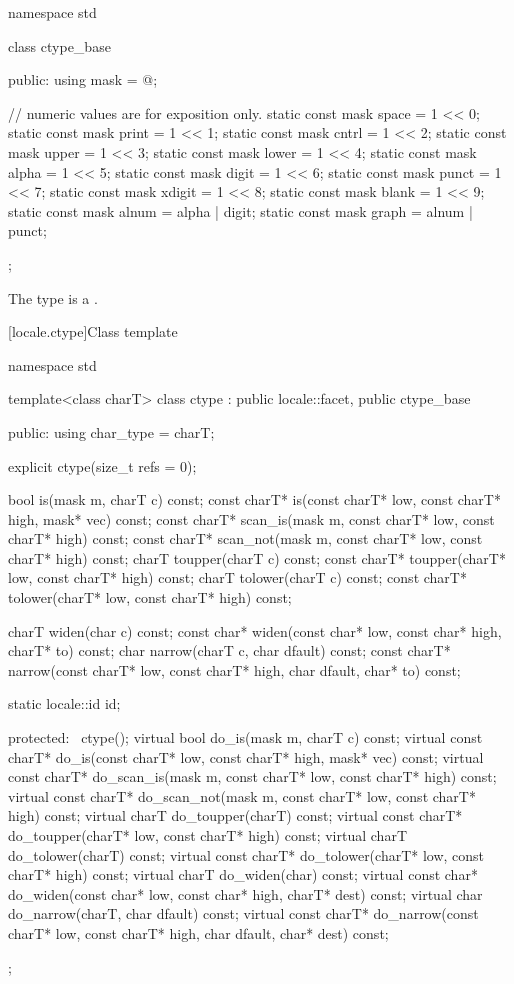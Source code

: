 %
\begin{codeblock}
namespace std {
  class ctype_base {
  public:
    using mask = @\seebelow@;

    // numeric values are for exposition only.
    static const mask space  = 1 << 0;
    static const mask print  = 1 << 1;
    static const mask cntrl  = 1 << 2;
    static const mask upper  = 1 << 3;
    static const mask lower  = 1 << 4;
    static const mask alpha  = 1 << 5;
    static const mask digit  = 1 << 6;
    static const mask punct  = 1 << 7;
    static const mask xdigit = 1 << 8;
    static const mask blank  = 1 << 9;
    static const mask alnum  = alpha | digit;
    static const mask graph  = alnum | punct;
  };
}
\end{codeblock}

\pnum
The type
is a .

[locale.ctype]{Class template }

%
\begin{codeblock}
namespace std {
  template<class charT>
    class ctype : public locale::facet, public ctype_base {
    public:
      using char_type = charT;

      explicit ctype(size_t refs = 0);

      bool         is(mask m, charT c) const;
      const charT* is(const charT* low, const charT* high, mask* vec) const;
      const charT* scan_is(mask m, const charT* low, const charT* high) const;
      const charT* scan_not(mask m, const charT* low, const charT* high) const;
      charT        toupper(charT c) const;
      const charT* toupper(charT* low, const charT* high) const;
      charT        tolower(charT c) const;
      const charT* tolower(charT* low, const charT* high) const;

      charT        widen(char c) const;
      const char*  widen(const char* low, const char* high, charT* to) const;
      char         narrow(charT c, char dfault) const;
      const charT* narrow(const charT* low, const charT* high, char dfault, char* to) const;

      static locale::id id;

    protected:
      ~ctype();
      virtual bool         do_is(mask m, charT c) const;
      virtual const charT* do_is(const charT* low, const charT* high, mask* vec) const;
      virtual const charT* do_scan_is(mask m, const charT* low, const charT* high) const;
      virtual const charT* do_scan_not(mask m, const charT* low, const charT* high) const;
      virtual charT        do_toupper(charT) const;
      virtual const charT* do_toupper(charT* low, const charT* high) const;
      virtual charT        do_tolower(charT) const;
      virtual const charT* do_tolower(charT* low, const charT* high) const;
      virtual charT        do_widen(char) const;
      virtual const char*  do_widen(const char* low, const char* high, charT* dest) const;
      virtual char         do_narrow(charT, char dfault) const;
      virtual const charT* do_narrow(const charT* low, const charT* high,
                                     char dfault, char* dest) const;
    };
}
\end{codeblock}

